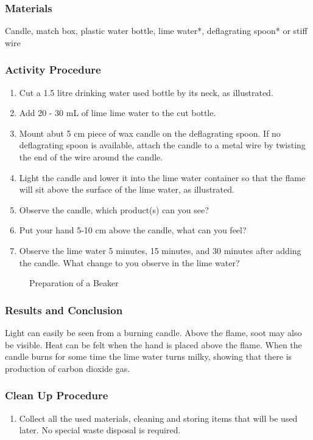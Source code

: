 \subsubsection*{Materials}
Candle, match box, plastic water bottle, lime water*, deflagrating spoon* or stiff wire

\subsubsection*{Activity Procedure}
\begin{enumerate}
\item{Cut a 1.5 litre drinking water used bottle by its neck, as illustrated.}
\item{Add 20 - 30 mL of lime lime water to the cut bottle.}
\item{Mount abut 5 cm piece of wax candle on the deflagrating spoon. If no deflagrating spoon is available, attach the candle to a metal wire by twisting the end of the wire around the candle.}
\item{Light the candle and lower it into the lime water container so that the flame will sit above the surface of the lime water, as illustrated.}
\item{Observe the candle, which product(s) can you see?}
\item{Put your hand 5-10 cm above the candle, what can you feel?}
\item{Observe the lime water 5 minutes, 15 minutes, and 30 minutes after adding the candle. What change to you observe in the lime water?}
\end{enumerate}

\begin{figure}[h]
\begin{center}
\def\svgwidth{350pt}

\caption{Preparation of a Beaker}
\end{center}
\end{figure}

\subsubsection*{Results and Conclusion}
Light can easily be seen from a burning candle. Above the flame, soot may also be visible. Heat can be felt when the hand is placed above the flame. When the candle burns for some time the lime water turns milky, showing that there is production of carbon dioxide gas.

\subsubsection*{Clean Up Procedure}
\begin{enumerate}
\item{Collect all the used materials, cleaning and storing items that will be used later. No special waste disposal is required.}
\end{enumerate}

